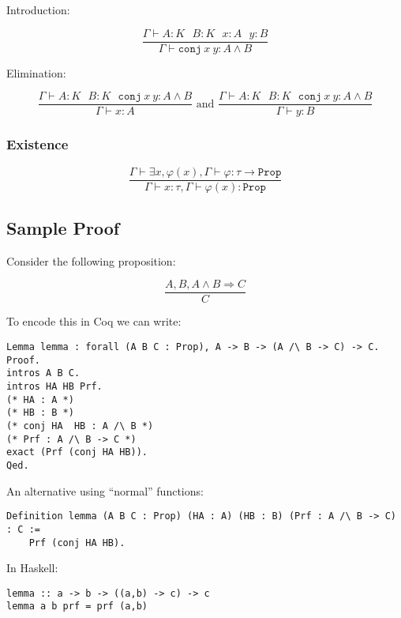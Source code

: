 \documentclass[10pt]{article}
\begin{document}
Introduction:

\begin{equation*}
    \frac{\Gamma \vdash A : K~~~B : K~~~x : A~~~y : B}{\Gamma \vdash \mathtt{conj}~x~y : A \wedge B}
\end{equation*}

Elimination:

\begin{equation*}
    \frac{\Gamma \vdash A : K~~~B : K~~~\mathtt{conj}~x~y : A \wedge B}{\Gamma \vdash x : A} \text{ and }
    \frac{\Gamma \vdash A : K~~~B : K~~~\mathtt{conj}~x~y : A \wedge B}{\Gamma \vdash y : B}
\end{equation*}

\subsubsection{Existence}

\begin{equation*}
    \frac{\Gamma \vdash \exists x, \varphi(x), \Gamma \vdash \varphi : \tau \rightarrow \mathtt{Prop}}{\Gamma \vdash x : \tau, \Gamma \vdash \varphi(x) : \mathtt{Prop} }
\end{equation*}

\subsection{Sample Proof}

Consider the following proposition:

$$\frac{A,B,A \wedge B \Rightarrow C}{C}$$

To encode this in Coq we can write:

\begin{verbatim}
Lemma lemma : forall (A B C : Prop), A -> B -> (A /\ B -> C) -> C.
Proof.
intros A B C.
intros HA HB Prf.
(* HA : A *)
(* HB : B *)
(* conj HA  HB : A /\ B *)
(* Prf : A /\ B -> C *)
exact (Prf (conj HA HB)).
Qed.
\end{verbatim}

An alternative using ``normal'' functions:

\begin{verbatim}
Definition lemma (A B C : Prop) (HA : A) (HB : B) (Prf : A /\ B -> C) : C :=
    Prf (conj HA HB).
\end{verbatim}

In Haskell:
\begin{verbatim}
lemma :: a -> b -> ((a,b) -> c) -> c
lemma a b prf = prf (a,b)
\end{verbatim}
\end{document}
